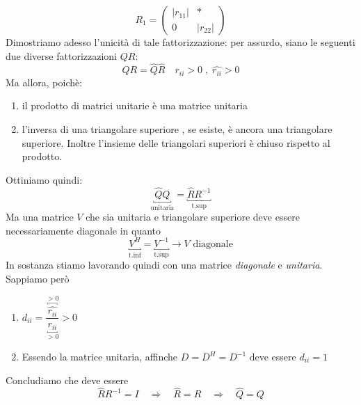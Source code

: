 \begin{thproof}
$$
R_1 =
\begin{pmatrix}
  |r_{11}|  & * \\
 0 & |r_{22}|
\end{pmatrix}
$$
Dimostriamo adesso l'unicit\`a di tale fattorizzazione:
per assurdo, siano le seguenti due diverse fattorizzazioni $QR$:
$$ QR = \hat{Q} \hat{R} \quad r_{ii}>0 \;,\; \hat{r_{ii}}> 0 $$
Ma allora, poich\`e:
\begin{enumerate}
\item il prodotto di matrici unitarie \`e una  matrice unitaria
 \item l'inversa di una triangolare superiore , se esiste,
   \`e ancora una triangolare superiore. Inoltre l'insieme
   delle triangolari superiori \`e chiuso rispetto al prodotto.
\end{enumerate}
Ottiniamo quindi:
$$ \underbracket{\hat{Q}{Q}}_{\text{unitaria}} =
\underbracket{\hat{R}R^{-1}}_{\text{t.sup}}
$$
Ma una matrice $V$ che sia unitaria e triangolare superiore
 deve essere necessariamente diagonale in quanto
$$
\underbracket{V^{H}}_{\text{t.inf}} =\underbracket{V^{-1}}_{\text{t.sup}}
 \rightarrow V \text{ diagonale}
$$
In sostanza stiamo lavorando quindi con una matrice
\emph{diagonale} e \emph{unitaria}. Sappiamo per\`o
\begin{enumerate}
\item $d_{ii} = \dfrac{\overbracket{\hat{r_{ii}}}^{>0}}
  {\underbracket{r_{ii}}_{>0}} > 0$
\item Essendo la matrice unitaria, affinche $D=D^{H} = D^{-1}$
  deve essere $d_{ii}=1$
\end{enumerate}
Concludiamo che deve essere
$$ \hat{R}R^{-1} = I \quad \Rightarrow \quad
\hat{R} = R \quad \Rightarrow \quad \hat{Q} = Q$$
  \end{thproof}


